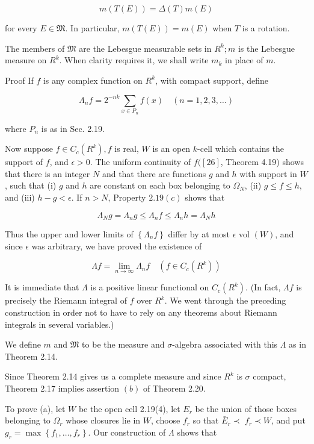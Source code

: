 \documentclass[10pt]{article}
\begin{document}
$$
m(T(E))=\Delta(T) m(E)
$$

for every $E \in \mathfrak{M}$. In particular, $m(T(E))=m(E)$ when $T$ is a rotation.

The members of $\mathfrak{M}$ are the Lebesgue measurable sets in $R^{k} ; m$ is the Lebesgue measure on $R^{k}$. When clarity requires it, we shall write $m_{k}$ in place of $m$.

Proof If $f$ is any complex function on $R^{k}$, with compact support, define

$$
\Lambda_{n} f=2^{-n k} \sum_{x \in P_{n}} f(x) \quad(n=1,2,3, \ldots)
$$

where $P_{n}$ is as in Sec. 2.19.

Now suppose $f \in C_{c}\left(R^{k}\right), f$ is real, $W$ is an open $k$-cell which contains the support of $f$, and $\epsilon>0$. The uniform continuity of $f([26]$, Theorem 4.19) shows that there is an integer $N$ and that there are functions $g$ and $h$ with support in $W$, such that (i) $g$ and $h$ are constant on each box belonging to $\Omega_{N}$, (ii) $g \leq f \leq h$, and (iii) $h-g<\epsilon$. If $n>N$, Property $2.19(c)$ shows that

$$
\Lambda_{N} g=\Lambda_{n} g \leq \Lambda_{n} f \leq \Lambda_{n} h=\Lambda_{N} h
$$

Thus the upper and lower limits of $\left\{\Lambda_{n} f\right\}$ differ by at most $\epsilon$ vol $(W)$, and since $\epsilon$ was arbitrary, we have proved the existence of

$$
\Lambda f=\lim _{n \rightarrow \infty} \Lambda_{n} f \quad\left(f \in C_{c}\left(R^{k}\right)\right)
$$

It is immediate that $\Lambda$ is a positive linear functional on $C_{c}\left(R^{k}\right)$. (In fact, $\Lambda f$ is precisely the Riemann integral of $f$ over $R^{k}$. We went through the preceding construction in order not to have to rely on any theorems about Riemann integrals in several variables.)

We define $m$ and $\mathfrak{M}$ to be the measure and $\sigma$-algebra associated with this $\Lambda$ as in Theorem 2.14.

Since Theorem 2.14 gives us a complete measure and since $R^{k}$ is $\sigma$ compact, Theorem 2.17 implies assertion $(b)$ of Theorem 2.20.

To prove (a), let $W$ be the open cell 2.19(4), let $E_{r}$ be the union of those boxes belonging to $\Omega_{r}$ whose closures lie in $W$, choose $f_{r}$ so that $\bar{E}_{r} \prec$ $f_{r} \prec W$, and put $g_{r}=\max \left\{f_{1}, \ldots, f_{r}\right\}$. Our construction of $\Lambda$ shows that
\end{document}
